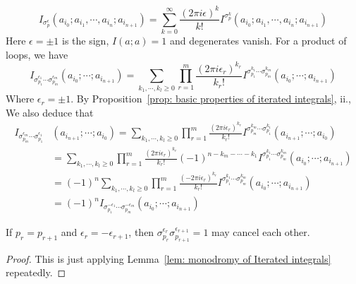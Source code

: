 \begin{corollary}\label{cor: monodromy of iterated integral}
\begin{equation}\label{eq: monodromy for iterated integral in general - one loop}
I_{\sigma_p^{\epsilon}}(a_{i_0};a_{i_1},\cdots,a_{i_n};a_{i_{n+1}})=\sum_{k=0}^\infty\frac{(2\pi i\epsilon)^k}{k!} I^{\sigma_p^k}(a_{i_0};a_{i_1},\cdots,a_{i_n};a_{i_{n+1}})
\end{equation}
Here $\epsilon=\pm1$ is the sign, $I(a;a)=1$ and degenerates vanish. For a product of loops, we have
\begin{equation}\label{eq: monodromy for iterated integral in general}
I_{\sigma_{p_{1}}^{\epsilon_1}\cdots \sigma_{p_{m}}^{\epsilon_m}}(a_{i_0};\cdots;a_{i_{n+1}})=\sum_{k_1,\cdots,k_l\geq0}\prod_{r=1}^{m}\frac{(2\pi i\epsilon_r)^{k_r}}{k_r!}I^{\sigma_{p_{1}}^{k_1}\cdots\sigma_{p_{m}}^{k_m}}(a_{i_0};\cdots;a_{i_{n+1}})
\end{equation}
Where $\epsilon_r=\pm1$. By Proposition~\ref{prop: basic properties of iterated integrals}, ii., We also deduce that
\begin{equation}\label{eq: monodromy for iterated integral in general - path reversed}
\begin{aligned}
I_{\sigma_{p_m}^{\epsilon_m}\cdots\sigma_{p_1}^{\epsilon_1}}&(a_{i_{n+1}};\cdots;a_{i_0})=\sum_{k_1,\cdots,k_l\geq0}\prod_{r=1}^{m}\frac{(2\pi i\epsilon_r)^{k_r}}{k_r!}I^{\sigma_{p_m}^{k_m}\cdots\sigma_{p_1}^{k_1}}(a_{i_{n+1}};\cdots;a_{i_0})\\
&=\sum_{k_1,\cdots,k_l\geq0}\prod_{r=1}^{m}\frac{(2\pi i\epsilon_r)^{k_r}}{k_r!}(-1)^{n-k_m-\cdots-k_1}I^{\sigma_{p_1}^{k_1}\cdots\sigma_{p_m}^{k_m}}(a_{i_0};\cdots;a_{i_{n+1}})\\
&=(-1)^n\sum_{k_1,\cdots,k_l\geq0}\prod_{r=1}^{m}\frac{(-2\pi i\epsilon_r)^{k_r}}{k_r!}I^{\sigma_{p_1}^{k_1}\cdots\sigma_{p_m}^{k_m}}(a_{i_0};\cdots;a_{i_{n+1}})\\
&=(-1)^nI_{\sigma_{p_1}^{-\epsilon_1}\cdots\sigma_{p_m}^{-\epsilon_m}}(a_{i_0};\cdots;a_{i_{n+1}})
\end{aligned}
\end{equation}
\end{corollary}

\begin{remark}
If $p_r=p_{r+1}$ and $\epsilon_r=-\epsilon_{r+1}$, then $\sigma_{p_r}^{\epsilon_r}\sigma_{p_{r+1}}^{\epsilon_{r+1}}=1$ may cancel each other.
\end{remark}

\begin{proof}
This is just applying Lemma~\ref{lem: monodromy of Iterated integrals} repeatedly.
\end{proof}

